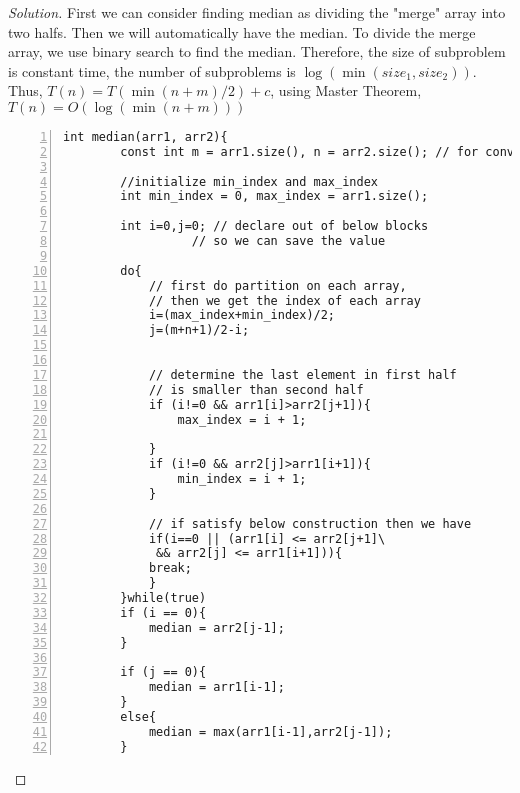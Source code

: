 \documentclass[12pt]{article}
\begin{document}
\begin{proof}[Solution]
	First we can consider finding median as dividing the "merge" array into two halfs. Then we will automatically have the median. To divide the merge array, we use binary search to find the median. Therefore, the size of subproblem is constant time, the number of subproblems is $\log(\min(size_1, size_2))$. Thus, $T(n) = T(\min(n+m)/2) + c$, using Master Theorem, $T(n) = O(\log (\min(n+m)))$ \\
	\begin{lstlisting}[language={[ANSI]C},numbers=left,numberstyle=\tiny,%frame=shadowbox,  
		rulesepcolor=\color{red!20!green!20!blue!20},  
		keywordstyle=\color{blue!70!black},  
		commentstyle=\color{blue!90!},  
		basicstyle=\ttfamily]  
	int median(arr1, arr2){
		const int m = arr1.size(), n = arr2.size(); // for convenience
		
		//initialize min_index and max_index
		int min_index = 0, max_index = arr1.size(); 
		
		int i=0,j=0; // declare out of below blocks 
			      // so we can save the value
			      
		do{
			// first do partition on each array, 
			// then we get the index of each array
			i=(max_index+min_index)/2;
			j=(m+n+1)/2-i; 
			
			
			// determine the last element in first half 
			// is smaller than second half
			if (i!=0 && arr1[i]>arr2[j+1]){
				max_index = i + 1;
				
			}
			if (i!=0 && arr2[j]>arr1[i+1]){
				min_index = i + 1;
			}
		
			// if satisfy below construction then we have 
			if(i==0 || (arr1[i] <= arr2[j+1]\
			 && arr2[j] <= arr1[i+1])){
			break;
			}
		}while(true)
		if (i == 0){
			median = arr2[j-1];
		}
	
		if (j == 0){
			median = arr1[i-1];
		}
		else{
			median = max(arr1[i-1],arr2[j-1]);
		}
	\end{lstlisting}

	
\end{proof}
\end{document}
